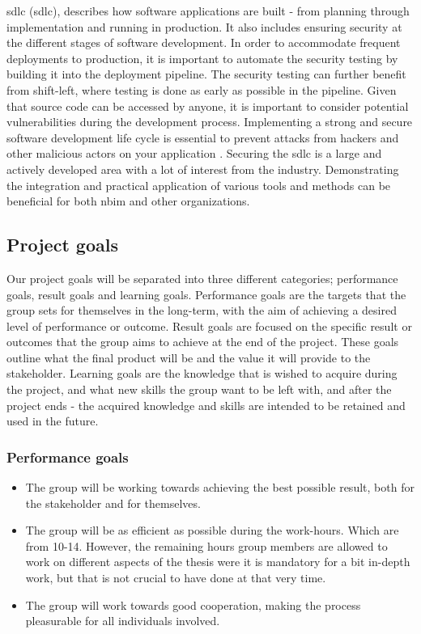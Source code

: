 \acrlong{sdlc} (\acrshort{sdlc}), describes how software applications are built - from planning through implementation and running in production. It also includes ensuring security at the different stages of software development. In order to accommodate frequent deployments to production, it is important to automate the security testing by building it into the deployment pipeline. The security testing can further benefit from shift-left, where testing is done as early as possible in the pipeline. Given that source code can be accessed by anyone, it is important to consider potential vulnerabilities during the development process. Implementing a strong and secure software development life cycle is essential to prevent attacks from hackers and other malicious actors on your application 
\cite{sdlc1}. Securing the \acrshort{sdlc} is a large and actively developed area with a lot of interest from the industry. Demonstrating the integration and practical application of various tools and methods can be beneficial for both \acrshort{nbim} and other organizations.


\subsection{Project goals}
Our project goals will be separated into three different categories; performance goals, result goals and learning goals. Performance goals are the targets that the group sets for themselves in the long-term, with the aim of achieving a desired level of performance or outcome. Result goals are focused on the specific result or outcomes that the group aims to achieve at the end of the project. These goals outline what the final product will be and the value it will provide to the stakeholder. Learning goals are the knowledge that is wished to acquire during the project, and what new skills the group want to be left with, and after the project ends - the acquired knowledge and skills are intended to be retained and used in the future. 

\subsubsection{Performance goals}
\begin{itemize}
    \item  The group will be working towards achieving the best possible result, both for the stakeholder and for themselves.
    \item The group will be as efficient as possible during the work-hours. Which are from 10-14. However, the remaining hours group members are allowed to work on different aspects of the thesis were it is mandatory for a bit in-depth work, but that is not crucial to have done at that very time. 
    \item The group will work towards good cooperation, making the process pleasurable for all individuals involved.
\end{itemize}


